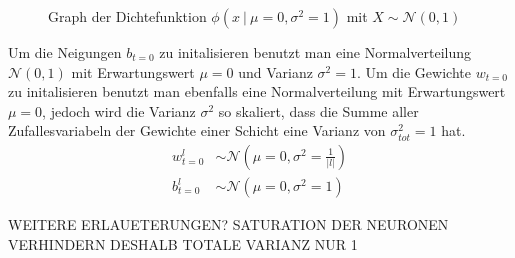 \begin{figure}[h!]
  \centering
  \caption{Graph der Dichtefunktion $\phi(x\ |\ \mu=0,\sigma^2=1)$ mit $X\sim\mathcal{N}(0,1)$}%
\end{figure}


Um die Neigungen $b_{t=0}$ zu initalisieren benutzt man eine Normalverteilung
$\mathcal{N}(0,1)$ mit Erwartungswert $\mu = 0$ und Varianz $\sigma^2 =
1$. Um die Gewichte $w_{t=0}$ zu initalisieren benutzt man ebenfalls eine
Normalverteilung mit Erwartungswert $\mu = 0$, jedoch wird die Varianz
$\sigma^2$ so skaliert, dass die Summe aller Zufallesvariabeln der Gewichte
einer Schicht eine Varianz von $\sigma^2_{tot} = 1$ hat.
\begin{align}
  w_{t=0}^l &\sim \mathcal{N}(\mu = 0, \sigma^2 = \frac{1}{|l|}) \\
  b_{t=0}^l &\sim \mathcal{N}(\mu = 0, \sigma^2 = 1)
\end{align}


WEITERE ERLAUETERUNGEN? SATURATION DER NEURONEN VERHINDERN DESHALB TOTALE VARIANZ
NUR 1

\para{}
\cite{wiki:normal_distribution}
\cite{Nielsen}

